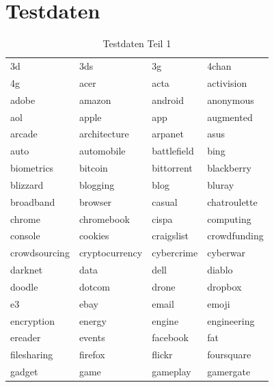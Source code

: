 \documentclass[12pt,a4paper]{report}
\begin{document}
	\section{Testdaten}
	\label{sec:Testdaten}
\begin{table}[h]
\caption{Testdaten Teil 1}
\begin{tabular}{l|l|l|l}\\
3d & 3ds & 3g & 4chan\\
4g & acer & acta & activision\\
adobe & amazon & android & anonymous\\
aol & apple & app & augmented\\
arcade & architecture & arpanet & asus\\
auto & automobile & battlefield & bing\\
biometrics & bitcoin & bittorrent & blackberry\\
blizzard & blogging & blog & bluray\\
broadband & browser & casual & chatroulette\\
chrome & chromebook & cispa & computing\\
console & cookies & craigslist & crowdfunding\\
crowdsourcing & cryptocurrency & cybercrime & cyberwar\\
darknet & data & dell & diablo\\
doodle & dotcom & drone & dropbox\\
e3 & ebay & email & emoji\\
encryption & energy & engine & engineering\\
ereader & events & facebook & fat\\
filesharing & firefox & flickr & foursquare\\
gadget & game & gameplay & gamergate\\

\end{tabular}
\end{table}
\newpage
\end{document}
